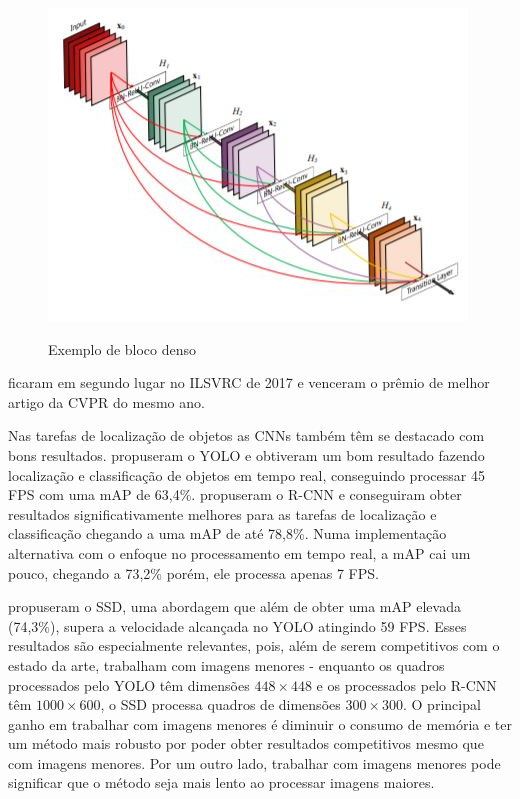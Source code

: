 \begin{figure}[H]
	\setlength{\abovecaptionskip}{0pt}
	\setlength{\belowcaptionskip}{0pt}
	\caption[Exemplo de bloco denso]{Exemplo de bloco denso}
	\centering
	\includegraphics[width=.5\textwidth]{imagem/0x_densenet_block.jpg}
	\captionsetup{justification=centering}
	\label{fig:blocodenso}
\end{figure}

\citeauthor{liu-2017} ficaram em segundo lugar no \ac{ILSVRC} de 2017 e venceram o prêmio de melhor artigo da \ac{CVPR} do mesmo ano.


Nas tarefas de localização de objetos as \ac{CNN}s também têm se destacado com bons resultados.  propuseram o \ac{YOLO} e obtiveram um bom resultado fazendo localização e classificação de objetos em tempo real, conseguindo processar 45 \ac{FPS} com uma \ac{mAP} de 63,4\%.  propuseram o \ac{R-CNN} e conseguiram obter resultados significativamente melhores para as tarefas de localização e classificação chegando a uma \ac{mAP} de até 78,8\%. Numa implementação alternativa com o enfoque no processamento em tempo real, a \ac{mAP} cai um pouco, chegando a 73,2\% porém, ele processa apenas 7 \ac{FPS}.

 propuseram o \ac{SSD}, uma abordagem que além de obter uma \ac{mAP} elevada (74,3\%), supera a velocidade alcançada no \ac{YOLO} atingindo 59 \ac{FPS}. Esses resultados são especialmente relevantes, pois, além de serem competitivos com o estado da arte, trabalham com imagens menores - enquanto os quadros processados pelo \ac{YOLO} têm dimensões $448 \times 448$ e os processados pelo \ac{R-CNN} têm $1000\times 600$, o \ac{SSD} processa quadros de dimensões $300 \times 300$. O principal ganho em trabalhar com imagens menores é diminuir o consumo de memória e ter um método mais robusto por poder obter resultados competitivos mesmo que com imagens menores. Por um outro lado, trabalhar com imagens menores pode significar que o método seja mais lento ao processar imagens maiores.

